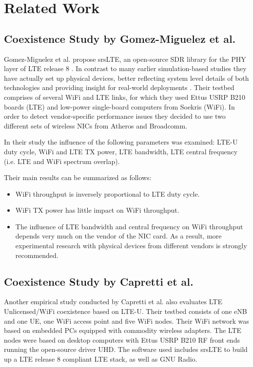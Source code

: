 \chapter{Related Work}

\section{Coexistence Study by Gomez-Miguelez et al.}

Gomez-Miguelez et al. propose srsLTE, an open-source SDR library for the PHY layer of LTE release 8 \cite{gomezmiguelez16}. In contrast to many earlier simulation-based studies they have actually set up physical devices, better reflecting system level details of both technologies and providing insight for real-world deployments \cite{rupasinghe14} \cite{nihtilä13} \cite{jeon14} \cite{cavalcante13} . Their testbed comprises of several WiFi and LTE links, for which they used Ettus USRP B210 boards (LTE) and low-power single-board computers from Soekris (WiFi). In order to detect vendor-specific performance issues they decided to use two different sets of wireless NICs from Atheros and Broadcomm.

In their study the influence of the following parameters was examined: LTE-U duty cycle, WiFi and LTE TX power, LTE bandwidth, LTE central frequency (i.e. LTE and WiFi spectrum overlap).

Their main results can be summarized as follows:

\begin{itemize}
	\item WiFi throughput is inversely proportional to LTE duty cycle.
	\item WiFi TX power has little impact on WiFi throughput.
	\item The influence of LTE bandwidth and central frequency on WiFi throughput depends very much on the vendor of the NIC card. As a result, more experimental research with physical devices from different vendors is strongly recommended. 
\end{itemize}

\section{Coexistence Study by Capretti et al.}

Another empirical study \cite{capretti16} conducted by Capretti et al. also evaluates LTE Unlicensed/WiFi coexistence based on LTE-U.  Their testbed consists of one eNB and one UE, one WiFi access point and five WiFi nodes. Their WiFi network was based on embedded PCs equipped with commodity wireless adapters. The LTE nodes were based on desktop computers with Ettus USRP B210 RF front ends running the open-source driver UHD. The software used includes srsLTE to build up a LTE release 8 compliant LTE stack, as well as GNU Radio. 


